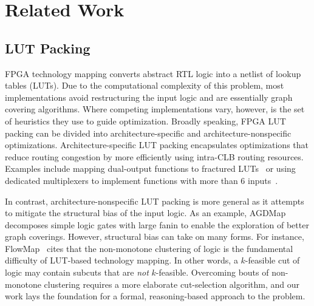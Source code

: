 \section{Related Work}\label{sec:relatedwork}
\subsection{LUT Packing}\label{sec:relatedwork:fpga}
FPGA technology mapping converts abstract RTL logic into a netlist of lookup
tables (LUTs). Due to the computational complexity of this problem, most
implementations avoid restructuring the input logic and are essentially graph
covering algorithms. Where competing implementations vary, however, is the set
of heuristics they use to guide optimization. Broadly speaking, FPGA LUT
packing can be divided into architecture-specific and architecture-nonspecific
optimizations. Architecture-specific LUT packing encapsulates optimizations
that reduce routing congestion by more efficiently using intra-CLB routing
resources. Examples include mapping dual-output functions to fractured
LUTs~\cite{fraclut} or using dedicated multiplexers to implement functions with
more than 6 inputs~\cite{ug574}.

In contrast, architecture-nonspecific LUT packing is more general as it
attempts to mitigate the structural bias of the input logic. As an example,
AGDMap~\cite{adaptdecomp} decomposes simple logic gates with large fanin to
enable the exploration of better graph coverings. However, structural bias can
take on many forms. For instance, FlowMap~\cite{flowmap} cites that the
non-monotone clustering of logic is the fundamental difficulty of LUT-based
technology mapping. In other words, a $k$-feasible cut of logic may contain
subcuts that are \textit{not} $k$-feasible. Overcoming bouts of non-monotone
clustering requires a more elaborate cut-selection algorithm, and our work lays
the foundation for a formal, reasoning-based approach to the problem.

